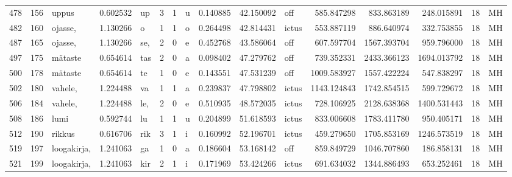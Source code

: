 \begin{tabular}{lrlrllllrrlrrrll}
478  &         156 &            uppus &  0.602532 &      up &        3 &      1 &       u &      0.140885 &     42.150092 &    off &   585.847298 &   833.863189 &   248.015891 &     18 &        MH \\
482  &         160 &          ojasse, &  1.130266 &       o &        1 &      1 &       o &      0.264498 &     42.814431 &  ictus &   553.887119 &   886.640974 &   332.753855 &     18 &        MH \\
487  &         165 &          ojasse, &  1.130266 &     se, &        2 &      0 &       e &      0.452768 &     43.586064 &    off &   607.597704 &  1567.393704 &   959.796000 &     18 &        MH \\
497  &         175 &          mätaste &  0.654614 &     tas &        2 &      0 &       a &      0.098402 &     47.279762 &    off &   739.352331 &  2433.366123 &  1694.013792 &     18 &        MH \\
500  &         178 &          mätaste &  0.654614 &      te &        1 &      0 &       e &      0.143551 &     47.531239 &    off &  1009.583927 &  1557.422224 &   547.838297 &     18 &        MH \\
502  &         180 &          vahele, &  1.224488 &      va &        1 &      1 &       a &      0.239837 &     47.798802 &  ictus &  1143.124843 &  1742.854515 &   599.729672 &     18 &        MH \\
506  &         184 &          vahele, &  1.224488 &     le, &        2 &      0 &       e &      0.510935 &     48.572035 &  ictus &   728.106925 &  2128.638368 &  1400.531443 &     18 &        MH \\
508  &         186 &             lumi &  0.592744 &      lu &        1 &      1 &       u &      0.204899 &     51.618593 &  ictus &   833.006608 &  1783.411780 &   950.405171 &     18 &        MH \\
512  &         190 &           rikkus &  0.616706 &     rik &        3 &      1 &       i &      0.160992 &     52.196701 &  ictus &   459.279650 &  1705.853169 &  1246.573519 &     18 &        MH \\
519  &         197 &      loogakirja, &  1.241063 &      ga &        1 &      0 &       a &      0.186604 &     53.168142 &    off &   859.849729 &  1046.707860 &   186.858131 &     18 &        MH \\
521  &         199 &      loogakirja, &  1.241063 &     kir &        2 &      1 &       i &      0.171969 &     53.424266 &  ictus &   691.634032 &  1344.886493 &   653.252461 &     18 &        MH \\

\end{tabular}
